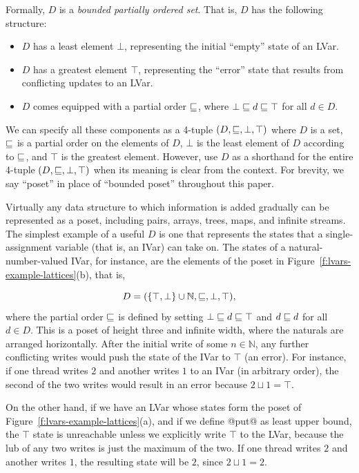 Formally, $D$ is a \emph{bounded partially ordered set}.  That is, $D$ has the following
structure:
\begin{itemize}
\item $D$ has a least element $\bot$, representing the initial
  ``empty'' state of an LVar.
\item $D$ has a greatest element $\top$, representing the ``error''
  state that results from conflicting updates to an LVar.
\item $D$ comes equipped with a partial order $\sqsubseteq$, where $\bot
  \sqsubseteq d \sqsubseteq \top$ for all $d \in D$.
\end{itemize}
We can specify all these components as a 4-tuple $(D, \sqsubseteq, \bot,
\top)$ where $D$ is a set, $\sqsubseteq$ is a partial order on the
elements of $D$, $\bot$ is the least element of $D$ according to
$\sqsubseteq$, and $\top$ is the greatest element.  However,
 use $D$ as a shorthand for the entire 4-tuple $(D,
\sqsubseteq, \bot, \top)$ when its meaning is clear from the context.
\ifdefined\JOURNAL
For brevity, we say ``poset'' in place of ``bounded poset'' throughout
this paper.
\fi

Virtually any data structure to which information is added gradually
can be represented as a poset, including pairs, arrays, trees, maps,
and infinite streams.  The simplest example of a useful $D$ is one
that represents the states that a single-assignment variable (that is,
an IVar) can take on.  The states of a natural-number-valued IVar, for
instance, are the elements of the poset in
Figure~\ref{f:lvars-example-lattices}(b), that is,

\vspace{-8mm}
\singlespacing
\begin{displaymath}
  D = (\lbrace \top, \bot \rbrace \cup \mathbb{N}, \sqsubseteq, \bot, \top), 
\end{displaymath}
\doublespacing
%
where the partial order $\sqsubseteq$ is defined by setting $\bot
\sqsubseteq d \sqsubseteq \top$ and $d \sqsubseteq d$ for all $d \in D$.  This
is a poset of height three and infinite width, where the naturals
are arranged horizontally.  After the initial write of some $n \in
\mathbb{N}$, any further conflicting writes would push the state of
the IVar to $\top$ (an error).  For instance, if one thread writes $2$
and another writes $1$ to an IVar (in arbitrary order), the second of
the two writes would result in an error because $2 \sqcup 1 = \top$.

On the other hand, if we have an LVar whose states form the poset of
Figure~\ref{f:lvars-example-lattices}(a), and if we define @put@ as
least upper bound, the $\top$ state is unreachable unless we
explicitly write $\top$ to the LVar, because the lub of any two writes
is just the maximum of the two.  If one thread writes $2$ and another
writes $1$, the resulting state will be $2$, since $2 \sqcup 1 = 2$.

